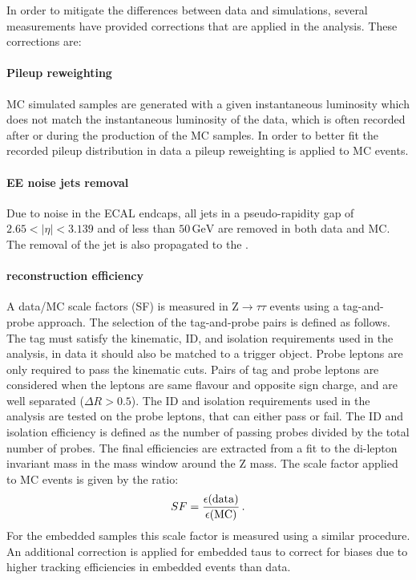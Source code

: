 In order to mitigate the differences between data and simulations, several measurements have provided corrections that are applied in the analysis. These corrections are:

\paragraph{Pileup reweighting} MC simulated samples are generated with a given instantaneous luminosity which does not match the instantaneous luminosity of the data, which is often recorded after or during the production of the MC samples. In order to better fit the recorded pileup distribution in data a pileup reweighting is applied to MC events.

\paragraph{EE noise jets removal} Due to noise in the ECAL endcaps, all jets in a pseudo-rapidity gap of $2.65 < |\eta| < 3.139$ and of less than $50 \,\mathrm{GeV}$ are removed in both data and MC. The removal of the jet is also propagated to the \MET.

\paragraph{\tauh reconstruction efficiency} A data/MC scale factors (SF) is measured in $\mathrm{Z}\rightarrow\tau\tau$ events using a tag-and-probe approach. The selection of the tag-and-probe pairs is defined as follows. The tag \tauh must satisfy the kinematic, ID, and isolation requirements used in the analysis, in data it should also be matched to a trigger object. Probe leptons are only required to pass the kinematic cuts. Pairs of tag and probe leptons are considered when the leptons are same flavour and opposite sign charge, and are well separated ($\Delta R > 0.5$). The ID and isolation requirements used in the analysis are tested on the probe leptons, that can either pass or fail. The ID and isolation efficiency is defined as the number of passing probes divided by the total number of probes. The final efficiencies are extracted from a fit to the di-lepton invariant mass in the mass window around the $\mathrm{Z}$ mass. The scale factor applied to MC events is given by the ratio:
\begin{equation}
    SF = \frac{\epsilon(\mathrm{data})}{\epsilon(\mathrm{MC})} \mend
\end{equation}
For the embedded samples this scale factor is measured using a similar procedure. An additional correction is applied for embedded taus to correct for biases due to higher tracking efficiencies in embedded events than data. 

